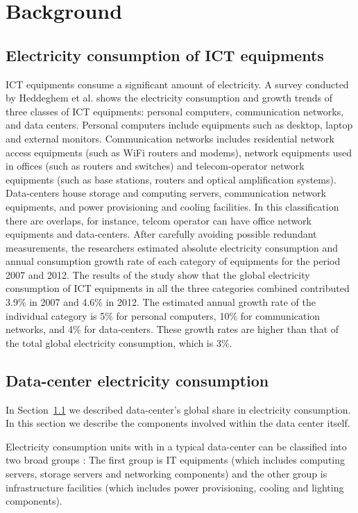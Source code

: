 \chapter{Background}
\label{chapter:background} 

\section{Electricity consumption of ICT equipments}
\label{section:ictequipment} 
ICT equipments consume a significant amount of electricity. A survey conducted by Heddeghem et al. \cite{DBLP:journals/comcom/HeddeghemLLCPD14} shows the electricity consumption and growth trends of three classes of ICT equipments: personal computers, communication networks, and data centers. Personal computers include equipments such as desktop, laptop and external monitors. Communication networks includes residential network access equipments (such as WiFi routers and modems), network equipments used in offices (such as routers and switches) and telecom-operator network equipments (such as base stations, routers and optical amplification systems). Data-centers house storage and computing servers, communication network equipments, and power provisioning and cooling facilities.  In this classification there are overlaps, for instance, telcom operator can have office network equipments and data-centers. After carefully avoiding possible redundant measurements, the researchers estimated absolute electricity consumption and annual consumption growth rate of each category of equipments for the period 2007 and 2012. The results of the study show that the global electricity consumption of ICT equipments in all the three categories combined contributed 3.9\% in 2007 and 4.6\% in 2012. The estimated annual growth rate of the individual category is 5\% for personal computers, 10\% for communication networks, and 4\% for data-centers. These growth rates are higher than that of the total global electricity consumption, which is 3\%.

\section {Data-center electricity consumption}
\label{section:datacenter} 
In Section~\ref{section:ictequipment} we described data-center's global share in electricity consumption. In this section we describe the components involved within the data center itself.

Electricity consumption units with in a typical data-center can be classified into two broad groups \cite{DBLP:journals/comsur/DayarathnaWF16}: The first group is IT equipments (which includes computing servers, storage servers and networking components) and the other group is infrastructure facilities (which includes power provisioning, cooling and lighting components).

